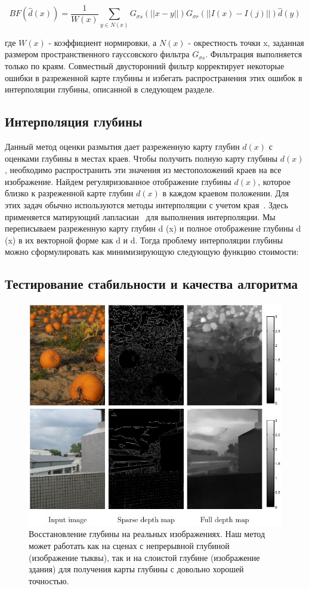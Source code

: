 \begin{equation}\label{eq:5}
BF(\hat{d}(x))=\frac{1}{W(x)}\sum_{y\in N(x)}G_{\sigma s}(||x-y||)G_{\sigma r}(||I(x)-I(j)||)\hat{d}(y)
\end{equation}

где $W(x)$ - коэффициент нормировки, а $N(x)$ - окрестность точки x, заданная размером пространственного гауссовского фильтра $G_{\sigma s}$. Фильтрация выполняется только по краям. Совместный двусторонний фильтр корректирует некоторые ошибки в разреженной карте глубины и избегать распространения этих ошибок в интерполяции глубины, описанной в следующем разделе.


\subsection{Интерполяция глубины}

Данный метод оценки размытия дает разреженную карту глубин $d(x)$ с оценками глубины в местах краев. Чтобы получить полную карту глубины $d(x)$, необходимо распространить эти значения из местоположений краев на все изображение. Найдем регуляризованное отображение глубины $d(x)$, которое близко к разреженной карте глубин $d(x)$ в каждом краевом положении. Для этих задач обычно используются методы интерполяции с учетом края~\cite{ACM2}. Здесь применяется матирующий лапласиан~\cite{IEEE2} для выполнения интерполяции.
Мы переписываем разреженную карту глубин d (x) и полное отображение глубины d (x) в их векторной форме как d и d. Тогда проблему интерполяции глубины можно сформулировать как минимизирующую следующую функцию стоимости:


\subsection{Тестирование стабильности и качества алгоритма}

\begin{figure}[H]
	\centering
	\includegraphics[width=0.7\linewidth]{pics/comparison}
	\caption{Восстановление глубины на реальных изображениях. Наш метод может работать как на сценах с непрерывной глубиной (изображение тыквы), так и на слоистой глубине (изображение здания) для получения карты глубины с довольно хорошей точностью.}
	\label{fig:comparison}
\end{figure}\

